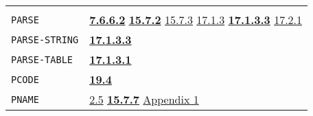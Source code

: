 \documentclass[a4paper]{scrbook}
\begin{document}
\begin{longtable}[]{@{}ll@{}}
\begin{minipage}[t]{0.70\columnwidth}
\strut
\end{minipage}\tabularnewline
\begin{minipage}[t]{0.24\columnwidth}\raggedright\strut
\texttt{PARSE}\strut
\end{minipage} & \begin{minipage}[t]{0.70\columnwidth}\raggedright\strut
\textbf{\href{07-structured-objects.md\#7662-parse-1}{7.6.6.2}}
\textbf{\href{15-lexical-blocking.md\#1572-parse-and-lparse-again}{15.7.2}}
\href{15-lexical-blocking.md\#1573-lookup}{15.7.3}
\href{17-macro-operations.md\#1713-program-defined-macro-characters}{17.1.3}
\textbf{\href{17-macro-operations.md\#17133-parse-and-lparse-finally}{17.1.3.3}}
\href{17-macro-operations.md\#1721-defmac-and-expand}{17.2.1}\strut
\end{minipage}\tabularnewline
\begin{minipage}[t]{0.24\columnwidth}\raggedright\strut
\texttt{PARSE-STRING}\strut
\end{minipage} & \begin{minipage}[t]{0.70\columnwidth}\raggedright\strut
\textbf{\href{17-macro-operations.md\#17133-parse-and-lparse-finally}{17.1.3.3}}\strut
\end{minipage}\tabularnewline
\begin{minipage}[t]{0.24\columnwidth}\raggedright\strut
\texttt{PARSE-TABLE}\strut
\end{minipage} & \begin{minipage}[t]{0.70\columnwidth}\raggedright\strut
\textbf{\href{17-macro-operations.md\#17131-read-finally}{17.1.3.1}}\strut
\end{minipage}\tabularnewline
\begin{minipage}[t]{0.24\columnwidth}\raggedright\strut
\texttt{PCODE}\strut
\end{minipage} & \begin{minipage}[t]{0.70\columnwidth}\raggedright\strut
\textbf{\href{19-compiled-programs.md\#194-pure-and-impure-code}{19.4}}\strut
\end{minipage}\tabularnewline
\begin{minipage}[t]{0.24\columnwidth}\raggedright\strut
\texttt{PNAME}\strut
\end{minipage} & \begin{minipage}[t]{0.70\columnwidth}\raggedright\strut
\href{02-read-evaluate-print.md\#25-example-type-atom-pname-1}{2.5}
\textbf{\href{15-lexical-blocking.md\#1577-pname}{15.7.7}}
\href{appendix-1-a-look-inside.md\#basic-data-structures}{Appendix 1}\strut
\end{minipage}\tabularnewline

\end{longtable}
\end{document}
